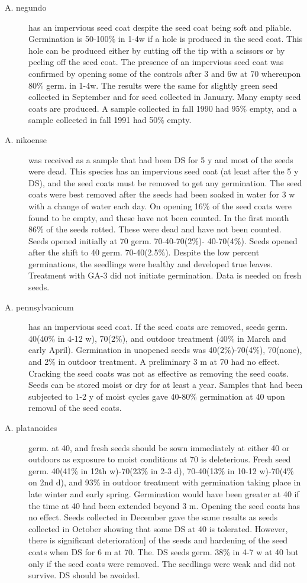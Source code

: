 \begin{description}
\item[A. negundo] has an impervious seed coat despite the seed coat being soft and
pliable. Germination is 50-100\% in 1-4w if a hole is produced in the seed coat. This
hole can be produced either by cutting off the tip with a scissors or by peeling off the
seed coat. The presence of an impervious seed coat was confirmed by opening some
of the controls after 3 and 6w at 70 whereupon 80\% germ. in 1-4w. The results were
the same for slightly green seed collected in September and for seed collected in
January. Many empty seed coats are produced. A sample collected in fall 1990 had
95\% empty, and a sample collected in fall 1991 had 50\% empty.

\item[A. nikoense] was received as a sample that had been DS for 5 y and most of the
seeds were dead. This species has an impervious seed coat (at least after the 5 y
DS), and the seed coats must be removed to get any germination. The seed coats
were best removed after the seeds had been soaked in water for 3 w with a change of
water each day. On opening 16\% of the seed coats were found to be empty, and
these have not been counted. In the first month 86\% of the seeds rotted. These were
dead and have not been counted. Seeds opened initially at 70 germ. 70-40-70(2\%)-
40-70(4\%). Seeds opened after the shift to 40 germ. 70-40(2.5\%). Despite the low
percent germinations, the seedlings were healthy and developed true leaves.
Treatment with GA-3 did not initiate germination. Data is needed on fresh seeds.

\item[A. pennsylvanicum] has an impervious seed coat. If the seed coats are
removed, seeds germ. 40(40\% in 4-12 w), 70(2\%), and outdoor treatment (40\% in
March and early April). Germination in unopened seeds was 40(2\%)-70(4\%),
70(none), and 2\% in outdoor treatment. A preliminary 3 m at 70 had no effect.
Cracking the seed coats was not as effective as removing the seed coats. Seeds can
be stored moist or dry for at least a year. Samples that had been subjected to 1-2 y of
moist cycles gave 40-80\% germination at 40 upon removal of the seed coats.

\item[A. platanoides] germ. at 40, and fresh seeds should be sown immediately at
either 40 or outdoors as exposure to moist conditions at 70 is deleterious. Fresh seed
germ. 40(41\% in 12th w)-70(23\% in 2-3 d), 70-40(13\% in 10-12 w)-70(4\% on 2nd d),
and 93\% in outdoor treatment with germination taking place in late winter and early
spring. Germination would have been greater at 40 if the time at 40 had been
extended beyond 3 m. Opening the seed coats has no effect. Seeds collected in
December gave the same results as seeds collected in October showing that some DS
at 40 is tolerated. However, there is significant deterioration] of the seeds and
hardening of the seed coats when DS for 6 m at 70. The. DS seeds germ. 38\% in 4-7
w at 40 but only if the seed coats were removed. The seedlings were weak and did
not survive. DS should be avoided.


\end{description}
